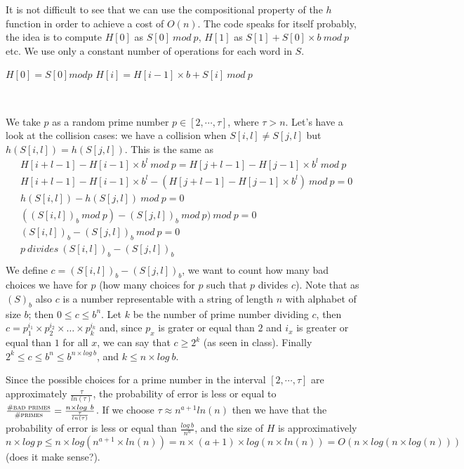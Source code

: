 \documentclass[a4paper]{article}
\begin{document}
It is not difficult to see that we can use the compositional property of the $h$ function in order to achieve a cost of $O(n)$.
The code speaks for itself probably, the idea is to compute $H[0]$ as $S[0]\ mod\ p$, $H[1]$ as $S[1] + S[0] \times b\ mod\ p$ etc.
We use only a constant number of operations for each word in $S$.
\begin{algorithmic}
\State $H[0] = S[0] mod p$
	\State $H[i] = H[i-1] \times b + S[i]\ mod\ p$
\EndFor
\end{algorithmic}

\

\noindent
We take $p$ as a random prime number $p\in [2,\cdots,\tau]$, where $\tau > n$.
Let's have a look at the collision cases: we have a collision when $S[i,l] \neq S[j,l]$ but $h(S[i,l]) = h(S[j,l])$.
This is the same as 
\begin{align*}				
&H[i + l - 1] - H[i - 1] \times b^l \ mod\ p = H[j + l - 1] - H[j - 1] \times b^l \ mod\ p \\
&H[i + l - 1] - H[i - 1] \times b^l - (H[j + l - 1] - H[j - 1] \times b^l) \ mod\ p = 0 \\
&h(S[i,l]) - h(S[j,l])\ mod\ p = 0 \\
&((S[i,l])_b\ mod\ p) - (S[j,l])_b\ mod\ p)\ mod\ p = 0 \\
&(S[i,l])_b - (S[j,l])_b\ mod\ p = 0 \\
&p\ divides\ (S[i,l])_b - (S[j,l])_b \\
\end{align*}
We define $c = (S[i,l])_b - (S[j,l])_b$, we want to count how many bad choices we have for $p$ (how many choices for $p$ such that $p$ divides $c$). 
Note that as $(S)_b$ also $c$ is a number representable with a string of length $n$ with alphabet of size $b$; then $0 \leq c \leq b^n$.
Let $k$ be the number of prime number dividing $c$, then $c = p_1^{i_1} \times p_2^{i_2} \times \dots \times p_k^{i_k}$ and, since $p_x$ is grater or equal than $2$ and $i_x$ is greater or equal than $1$ for all $x$, we can say that $c \geq 2^k$ (as seen in class).
Finally $2^k \leq c \leq b^n \leq b^{n \times log\ b}$, and $k \leq n \times log\ b$.

Since the possible choices for a prime number in the interval $[2,\cdots,\tau]$ are approximately $\frac{\tau}{ln(\tau)}$, the probability of error is less or equal to $\frac{\textsc{\#bad primes}}{\textsc{\#primes}}= \frac{n \times log\ b}{\frac{\tau}{ln(\tau)}}$.
If we choose $\tau \approx n^{a+1} ln(n)$ then we have that the probability of error is less or equal than $\frac{log\ b}{n^a}$, and the size of $H$ is approximatively $n \times log\ p \leq n \times log(n^{a+1} \times ln(n)) = n \times (a+1) \times log(n \times ln(n)) = O(n \times log(n \times log(n)))$ (does it make sense?).
\end{document}
